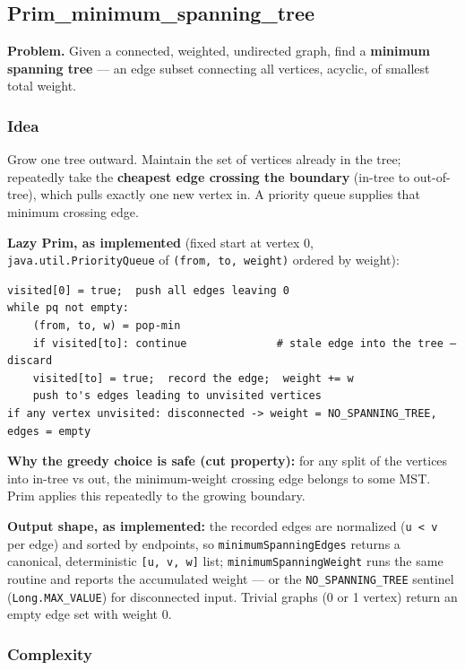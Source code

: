 \documentclass[
  10pt,
  letterpaper,
  onecolumn]{article}
\begin{document}
\hypertarget{prim_minimum_spanning_tree}{%
\subsection{Prim\_minimum\_spanning\_tree}\label{prim_minimum_spanning_tree}}

\textbf{Problem.} Given a connected, weighted, undirected graph, find a
\textbf{minimum spanning tree} --- an edge subset connecting all
vertices, acyclic, of smallest total weight.

\hypertarget{idea-23}{%
\subsubsection{Idea}\label{idea-23}}

Grow one tree outward. Maintain the set of vertices already in the tree;
repeatedly take the \textbf{cheapest edge crossing the boundary}
(in-tree to out-of-tree), which pulls exactly one new vertex in. A
priority queue supplies that minimum crossing edge.

\textbf{Lazy Prim, as implemented} (fixed start at vertex 0,
\texttt{java.util.PriorityQueue} of \texttt{(from,\ to,\ weight)}
ordered by weight):

\begin{verbatim}
visited[0] = true;  push all edges leaving 0
while pq not empty:
    (from, to, w) = pop-min
    if visited[to]: continue              # stale edge into the tree — discard
    visited[to] = true;  record the edge;  weight += w
    push to's edges leading to unvisited vertices
if any vertex unvisited: disconnected -> weight = NO_SPANNING_TREE, edges = empty
\end{verbatim}

\textbf{Why the greedy choice is safe (cut property):} for any split of
the vertices into in-tree vs out, the minimum-weight crossing edge
belongs to some MST. Prim applies this repeatedly to the growing
boundary.

\textbf{Output shape, as implemented:} the recorded edges are normalized
(\texttt{u\ \textless{}\ v} per edge) and sorted by endpoints, so
\texttt{minimumSpanningEdges} returns a canonical, deterministic
\texttt{{[}u,\ v,\ w{]}} list; \texttt{minimumSpanningWeight} runs the
same routine and reports the accumulated weight --- or the
\texttt{NO\_SPANNING\_TREE} sentinel (\texttt{Long.MAX\_VALUE}) for
disconnected input. Trivial graphs (0 or 1 vertex) return an empty edge
set with weight 0.

\hypertarget{complexity-23}{%
\subsubsection{Complexity}\label{complexity-23}}
\end{document}
